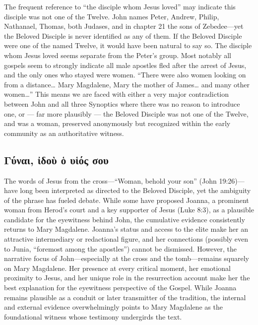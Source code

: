 The frequent reference to ``the disciple whom Jesus loved'' may indicate this disciple was not one of the Twelve.
John names Peter, Andrew, Philip, Nathanael, Thomas, both Judases, and in chapter 21 the sons of Zebedee---yet the Beloved Disciple is never identified as any of them.
If the Beloved Disciple were one of the named Twelve, it would have been natural to say so.
The disciple whom Jesus loved seems separate from the Peter's group.
Most notably all gospels seem to strongly indicate all male apostles fled after the arrest of Jesus, and the only ones who stayed were women.
``There were also women looking on from a distance\ldots{} Mary Magdalene, Mary the mother of James\ldots{} and many other women\ldots'' This means we are faced with either a very major contradiction between John and all three Synoptics where there was no reason to introduce one, or --- far more plausibly --- the Beloved Disciple was not one of the Twelve, and was a woman, preserved anonymously but recognized within the early community as an authoritative witness.

\subsection{Γύναι, ἰδοὺ ὁ υἱός σου}\label{subsec:ux3b3ux3cdux3b9-ux1f30ux3b4ux3bfux1f7a-ux1f41-ux3c5ux1f31ux3ccux3c2-ux3c3ux3bfux3c5}

The words of Jesus from the cross---“Woman, behold your son” (John 19:26)---have long been interpreted as directed to the Beloved Disciple, yet the ambiguity of the phrase has fueled debate. While some have proposed Joanna, a prominent woman from Herod’s court and a key supporter of Jesus (Luke 8:3), as a plausible candidate for the eyewitness behind John, the cumulative evidence consistently returns to Mary Magdalene. Joanna’s status and access to the elite make her an attractive intermediary or redactional figure, and her connections (possibly even to Junia, “foremost among the apostles”) cannot be dismissed. However, the narrative focus of John---especially at the cross and the tomb---remains squarely on Mary Magdalene. Her presence at every critical moment, her emotional proximity to Jesus, and her unique role in the resurrection account make her the best explanation for the eyewitness perspective of the Gospel. While Joanna remains plausible as a conduit or later transmitter of the tradition, the internal and external evidence overwhelmingly points to Mary Magdalene as the foundational witness whose testimony undergirds the text.

